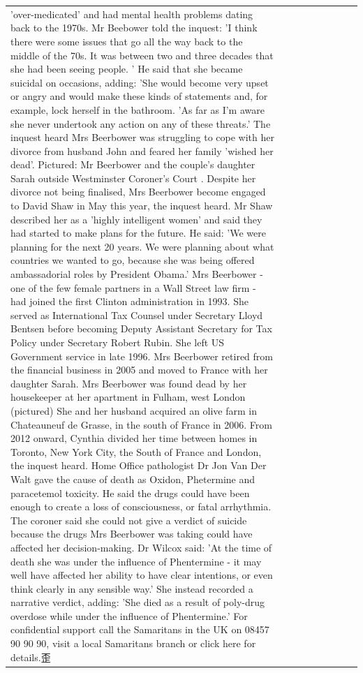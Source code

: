 \begin{table}[H]
\begin{tabular}{lllrlllll}
'over-medicated' and had mental health problems dating back to the 1970s. Mr Beebower told the inquest: 'I think there were some issues that go all the way back to the middle of the 70s. It was between two and three decades that she had been seeing people. ' He said that she became suicidal on occasions, adding: 'She would become very upset or angry and would make these kinds of statements and, for example, lock herself in the bathroom. 'As far as I'm aware she never undertook any action on any of these threats.' The inquest heard Mrs Beerbower was struggling to cope with her divorce from husband John and feared her family 'wished her dead'. Pictured: Mr Beerbower and the couple's daughter Sarah outside Westminster Coroner's Court . Despite her divorce not being finalised, Mrs Beerbower become engaged to David Shaw in May this year, the inquest heard. Mr Shaw described her as a 'highly intelligent women' and said they had started to make plans for the future. He said: 'We were planning for the next 20 years. We were planning about what countries we wanted to go, because she was being offered ambassadorial roles by President Obama.' Mrs Beerbower - one of the few female partners in a Wall Street law firm - had joined the first Clinton administration in 1993. She served as International Tax Counsel under Secretary Lloyd Bentsen before becoming Deputy Assistant Secretary for Tax Policy under Secretary Robert Rubin. She left US Government service in late 1996. Mrs Beerbower retired from the financial business in 2005 and moved to France with her daughter Sarah. Mrs Beerbower was found dead by her housekeeper at her apartment in Fulham, west London (pictured) She and her husband acquired an olive farm in Chateauneuf de Grasse, in the south of France in 2006. From 2012 onward, Cynthia divided her time between homes in Toronto, New York City, the South of France and London, the inquest heard. Home Office pathologist Dr Jon Van Der Walt gave the cause of death as Oxidon, Phetermine and paracetemol toxicity. He said the drugs could have been enough to create a loss of consciousness, or fatal arrhythmia. The coroner said she could not give a verdict of suicide because the drugs Mrs Beerbower was taking could have affected her decision-making. Dr Wilcox said: 'At the time of death she was under the influence of Phentermine - it may well have affected her ability to have clear intentions, or even think clearly in any sensible way.' She instead recorded a narrative verdict, adding: 'She died as a result of poly-drug overdose while under the influence of Phentermine.' For confidential support call the Samaritans in the UK on 08457 90 90 90, visit a local Samaritans branch or click here for details.歪 \\

\end{tabular}
\end{table}

